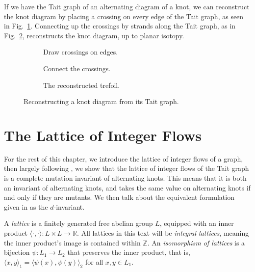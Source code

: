 \documentclass[12pt]{report}
\newcommand{\R}{\mathbb{R}}
\newcommand{\Z}{\mathbb{Z}}
\newcommand{\ip}[2]{\langle #1, #2 \rangle}
\theoremstyle{upright}
\begin{document}
If we have the Tait graph of an alternating diagram of a knot, we can reconstruct the knot diagram by placing a crossing on every edge of the Tait graph, as seen in Fig.~\ref{fig:trefoil-tait-with-crossings}. Connecting up the crossings by strands along the Tait graph, as in Fig.~\ref{fig:trefoil-resconstructed},	 reconstructs the knot diagram, up to planar isotopy.

\begin{figure}[h]
	\centering
	\hspace*{\fill}
	\begin{subfigure}[b]{0.3 \textwidth}
		\centering
		\def\svgscale{0.22}
		
		\caption{Draw crossings on edges.}
		\label{fig:trefoil-tait-with-crossings}
	\end{subfigure}
	\hspace*{\fill}
	\begin{subfigure}[b]{0.3 \textwidth}
		\centering
		\def\svgscale{0.22}
		
		\caption{Connect the crossings.}
		\label{fig:trefoil-resconstructed}
	\end{subfigure}
	\hspace*{\fill}
	\begin{subfigure}[b]{0.3 \textwidth}
		\centering
		\def\svgscale{0.2}
		
		\caption{The reconstructed trefoil.}
		\label{fig:trefoil-resconstructed-isotopy}
	\end{subfigure}
	\hspace*{\fill}
	\caption{Reconstructing a knot diagram from its Tait graph.}
	\label{fig:tait-reconstruction-example}
\end{figure}

\section{The Lattice of Integer Flows}

For the rest of this chapter, we introduce the lattice of integer flows of a graph, then largely following \cite{lattices-graphs-mutation}, we show that the lattice of integer flows of the Tait graph is a complete mutation invariant of alternating knots. This means that it is both an invariant of alternating knots, and takes the same value on alternating knots if and only if they are mutants. We then talk about the equivalent formulation given in \cite{lattices-graphs-mutation} as the $d$-invariant.

A \textit{lattice} is a finitely generated free abelian group $L$, equipped with an inner product 
\({\ip{\cdot}{\cdot}: L \times L \longrightarrow \R}\). All lattices in this text will be \textit{integral lattices}, meaning the inner product's image is contained within $\Z$. An \textit{isomorphism of lattices} is a bijection $\psi: L_{1} \longrightarrow L_{2}$ that preserves the inner product, that is, ${\ip{x}{y}_{1} = \ip{\psi(x)}{\psi(y)}_{2}}$ for all $x, y \in L_{1}$.
\end{document}
